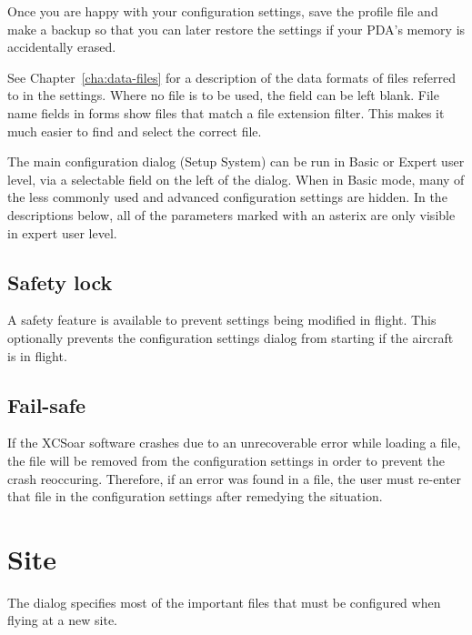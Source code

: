 \documentclass[a4paper,12pt]{refrep}
\begin{document}
\tip Once you are happy with your configuration settings, save the
profile file and make a backup so that you can later restore the
settings if your PDA's memory is accidentally erased.

See Chapter~\ref{cha:data-files} for a description of the data formats
of files referred to in the settings.  Where no file is to be used,
the field can be left blank.  File name fields in forms show files
that match a file extension filter.  This makes it much easier to find
and select the correct file.

The main configuration dialog (Setup System) can be run in Basic or
Expert user level, via a selectable field on the left of the dialog.
When in Basic mode, many of the less commonly used and advanced
configuration settings are hidden.  In the descriptions below,
all of the parameters marked with an asterix are only visible in
expert user level.


\subsection*{Safety lock}

A safety feature is available to prevent settings being modified in
flight.  This optionally prevents the configuration settings dialog
from starting if the aircraft is in flight.

\subsection*{Fail-safe}

If the XCSoar software crashes due to an unrecoverable error while
loading a file, the file will be removed from the configuration
settings in order to prevent the crash reoccuring.  Therefore, if an
error was found in a file, the user must re-enter that file in the
configuration settings after remedying the situation.

\clearpage
\section{Site}
The dialog specifies most of the important files that must be
configured when flying at a new site.
\end{document}
